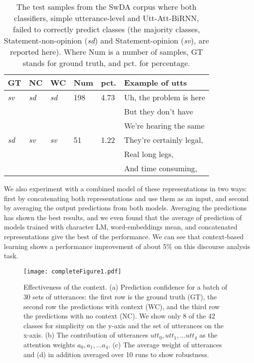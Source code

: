 \documentclass[a4paper]{article}
\begin{document}
\begin{table}[b]
\centering
\caption{The test samples from the SwDA corpus where both classifiers, simple utterance-level and Utt-Att-BiRNN, failed to correctly predict classes (the majority classes, Statement-non-opinion (\textit{sd}) and Statement-opinion (\textit{sv}), are reported here). Where Num is a number of samples, GT stands for ground truth, and pct. for percentage.}
\label{tab:faliurepredictions}
\begin{tabular}{llllll}
\toprule
\textbf{GT} & \textbf{NC}  &  \textbf{WC} & \textbf{Num} & \textbf{pct.} & \textbf{Example of utts} \\
\midrule
\textit{sv}   &  \textit{sd}   &  \textit{sd}   & 198   &  4.73  & Uh, the problem is here \\
     &       &       &       &        & But they don't have \\
\vspace{0.3cm}
     &       &       &       &        & We're hearing the same \\
\textit{sd}   &  \textit{sv}   &  \textit{sv}   & 51    &  1.22  & They're certainly legal, \\
     &       &       &       &        & Real long legs, \\
     &       &       &       &        & And time consuming, \\

\bottomrule
\end{tabular}
\end{table}

We also experiment with a combined model of these representations in two ways: first by concatenating both representations and use them as an input, and second by averaging the output predictions from both models. 
Averaging the predictions has shown the best results, and we even found that the average of prediction of models trained with character LM, word-embeddings mean, and concatenated representations give the best of the performance.  
We can see that context-based learning shows a performance improvement of about 5\% on this discourse analysis task.



\begin{figure*}[t]
  \centering
  \texttt{[image: completeFigure1.pdf]}
  \caption{Effectiveness of the context. 
  (a) Prediction confidence for a batch of 30 sets of utterances: the first row is the ground truth (GT), the second row the predictions with context (WC), and the third row the predictions with no context (NC). 
  We show only 8 of the 42 classes for simplicity on the y-axis and the set of utterances on the x-axis. 
  (b) The contribution of utterances $utt_{0}, utt_{1},...utt_{4}$ as the attention weights $a_{0}, a_{1},...a_{4}$. 
  (c) The average weight of utterances and 
  (d) in addition averaged over 10 runs to show robustness.} 
  \label{fig:completeFigure}
\end{figure*}
\end{document}
